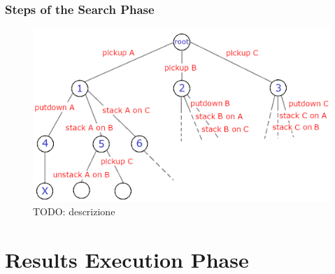 \subsubsection{Steps of the Search Phase}\label{sec:step_search}



\begin{figure} [h]
\centering
\includegraphics[width=1.0
\textwidth]{figures/Magistrale/BFS_1_blue}
\caption[BFS Example]{ TODO: descrizione
\label{fig:BFS_1}}
\end{figure} 

\section{Results Execution Phase}\label{sec:results_exec}

